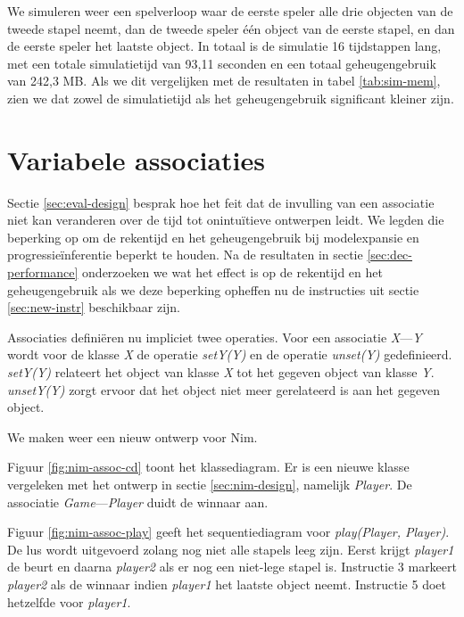 We simuleren weer een spelverloop waar de eerste speler alle drie objecten van de tweede stapel neemt, dan de tweede speler \'e\'en object van de eerste stapel, en dan de eerste speler het laatste object. In totaal is de simulatie 16 tijdstappen lang, met een totale simulatietijd van 93,11 seconden en een totaal geheugengebruik van 242,3 MB. Als we dit vergelijken met de resultaten in tabel \ref{tab:sim-mem}, zien we dat zowel de simulatietijd als het geheugengebruik significant kleiner zijn.

\section{Variabele associaties}\label{sec:var-assoc}

Sectie \ref{sec:eval-design} besprak hoe het feit dat de invulling van een associatie niet kan veranderen over de tijd tot onintu\"itieve ontwerpen leidt. We legden die beperking op om de rekentijd en het geheugengebruik bij modelexpansie en progressie\"inferentie beperkt te houden. Na de resultaten in sectie \ref{sec:dec-performance} onderzoeken we wat het effect is op de rekentijd en het geheugengebruik als we deze beperking opheffen nu de instructies uit sectie \ref{sec:new-instr} beschikbaar zijn.

Associaties defini\"eren nu impliciet twee operaties. Voor een associatie \textit{X}---\textit{Y} wordt voor de klasse \textit{X} de operatie \textit{setY(Y)} en de operatie \textit{unset(Y)} gedefinieerd. \textit{setY(Y)} relateert het object van klasse \textit{X} tot het gegeven object van klasse \textit{Y}. \textit{unsetY(Y)} zorgt ervoor dat het object niet meer gerelateerd is aan het gegeven object.

We maken weer een nieuw ontwerp voor Nim.

Figuur \ref{fig:nim-assoc-cd} toont het klassediagram. Er is een nieuwe klasse vergeleken met het ontwerp in sectie \ref{sec:nim-design}, namelijk \textit{Player}. De associatie \textit{Game}---\textit{Player} duidt de winnaar aan.

Figuur \ref{fig:nim-assoc-play} geeft het sequentiediagram voor \textit{play(Player, Player)}. De lus wordt uitgevoerd zolang nog niet alle stapels leeg zijn. Eerst krijgt \textit{player1} de beurt en daarna \textit{player2} als er nog een niet-lege stapel is. Instructie 3 markeert \textit{player2} als de winnaar indien \textit{player1} het laatste object neemt. Instructie 5 doet hetzelfde voor \textit{player1}.

